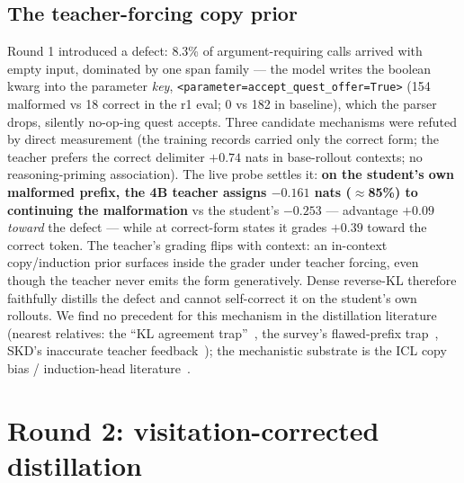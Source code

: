 \documentclass[11pt]{article}
\begin{document}
\subsection{The teacher-forcing copy prior}
\label{sec:copyprior}
Round 1 introduced a defect: 8.3\% of argument-requiring calls arrived with empty input,
dominated by one span family --- the model writes the boolean kwarg into the parameter
\emph{key}, \texttt{<parameter=accept\_quest\_offer=True>} (154 malformed vs 18 correct in the
r1 eval; 0 vs 182 in baseline), which the parser drops, silently no-op-ing quest accepts. Three
candidate mechanisms were refuted by direct measurement (the training records carried only the
correct form; the teacher prefers the correct delimiter $+0.74$ nats in base-rollout contexts;
no reasoning-priming association). The live probe settles it: \textbf{on the student's own
malformed prefix, the 4B teacher assigns $-0.161$ nats ($\approx$85\%) to continuing the
malformation} vs the student's $-0.253$ --- advantage $+0.09$ \emph{toward} the defect ---
while at correct-form states it grades $+0.39$ toward the correct token. The teacher's grading
flips with context: an in-context copy/induction prior surfaces inside the grader under teacher
forcing, even though the teacher never emits the form generatively. Dense reverse-KL therefore
faithfully distills the defect and cannot self-correct it on the student's own rollouts. We find
no precedent for this mechanism in the distillation literature (nearest relatives: the ``KL
agreement trap''~\cite{kat}, the survey's flawed-prefix trap~\cite{survey}, SKD's inaccurate
teacher feedback~\cite{skd}); the mechanistic substrate is the ICL copy bias / induction-head
literature~\cite{copybias,repetitioncurse}.

\section{Round 2: visitation-corrected distillation}
\end{document}
